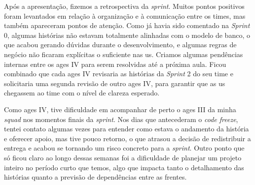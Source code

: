 Após a apresentação, fizemos a retrospectiva da \textit{sprint}. Muitos pontos positivos foram levantados em relação à organização e à comunicação entre os times, mas também apareceram pontos de atenção. Como já havia sido comentado na \textit{Sprint} 0, algumas histórias não estavam totalmente alinhadas com o modelo de banco, o que acabou gerando dúvidas durante o desenvolvimento, e algumas regras de negócio não ficaram explícitas o suficiente nas \ac{us}. Criamos algumas pendências internas entre os \ac{ages} IV para serem resolvidas até a próxima aula. Ficou combinado que cada \ac{ages} IV revisaria as histórias da \textit{Sprint} 2 do seu time e solicitaria uma segunda revisão de outro \ac{ages} IV, para garantir que as \ac{us} chegassem ao time com o nível de clareza esperado.

Como \ac{ages} IV, tive dificuldade em acompanhar de perto o \ac{ages} III da minha \textit{squad} nos momentos finais da \textit{sprint}. Nos dias que antecederam o \textit{code freeze}, tentei contato algumas vezes para entender como estava o andamento da história e oferecer apoio, mas tive pouco retorno, o que atrasou a decisão de redistribuir a entrega e acabou se tornando um risco concreto para a \textit{sprint}. Outro ponto que só ficou claro ao longo dessas semanas foi a dificuldade de planejar um projeto inteiro no período curto que temos, algo que impacta tanto o detalhamento das histórias quanto a previsão de dependências entre as frentes.
